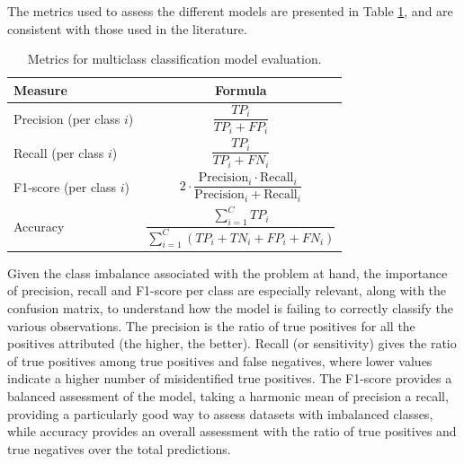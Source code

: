 \documentclass[conference]{IEEEtran}
\begin{document}
The metrics used to assess the different models are presented in Table \ref{evaluationmetrics}, and are consistent with those used in the literature.
\begin{table}[H]
\centering
\caption{Metrics for multiclass classification model evaluation.}
\label{evaluationmetrics}
\begin{tabular}{lc}
\toprule
\textbf{Measure} & \textbf{Formula} \\
\midrule
Precision (per class $i$) & $\dfrac{TP_i}{TP_i + FP_i}$ \\[1em]
Recall (per class $i$) & $\dfrac{TP_i}{TP_i + FN_i}$ \\[1em]
F1-score (per class $i$) & $2 \cdot \dfrac{\text{Precision}_i \cdot \text{Recall}_i}{\text{Precision}_i + \text{Recall}_i}$ \\[1em] 
Accuracy & $\dfrac{\sum_{i=1}^{C} TP_i}{\sum_{i=1}^{C} (TP_i + TN_i + FP_i + FN_i)}$ \\[1em]
\bottomrule
\end{tabular}
\end{table}

Given the class imbalance associated with the problem at hand, the importance of precision, recall and F1-score per class are especially relevant, along with the confusion matrix, to understand how the model is failing to correctly classify the various observations. The precision is the ratio of true positives for all the positives attributed (the higher, the better). Recall (or sensitivity) gives the ratio of true positives among true positives and false negatives, where lower values indicate a higher number of misidentified true positives. The F1-score provides a balanced assessment of the model, taking a harmonic mean of precision a recall, providing a particularly good way to assess datasets with imbalanced classes, while accuracy provides an overall assessment with the ratio of true positives and true negatives over the total predictions.

\end{document}
